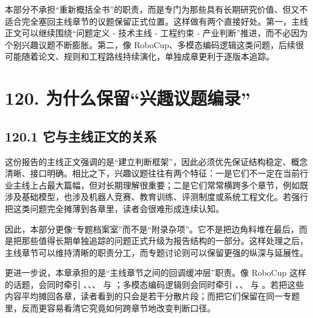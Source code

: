 

本部分不承担“重新概括全书”的职责，而是专门为那些具有长期研究价值、但又不适合完全塞回主线章节的议题保留正式位置。这样做有两个直接好处。第一，主线正文可以继续围绕“问题定义 - 技术主线 - 工程约束 - 产业判断”推进，而不必因为个别兴趣议题不断膨胀。第二，像 RoboCup、多模态编码逻辑这类问题，后续很可能随着论文、规则和工程路线持续演化，单独成章更利于逐版本追踪。

\section*{120. 为什么保留“兴趣议题编录”}

\subsection*{120.1 它与主线正文的关系}


这份报告的主线正文强调的是“建立判断框架”，因此必须优先保证结构稳定、概念清晰、接口明确。相比之下，兴趣议题往往有两个特征：一是它们不一定在当前行业主线上占最大篇幅，但对长期理解很重要；二是它们常常横跨多个章节，例如既涉及基础模型，也涉及机器人竞赛、教育训练、评测制度或系统工程文化。若强行把这类问题完全摊薄到各章里，读者会很难形成连续认知。

因此，本部分更像“专题档案室”而不是“附录杂项”。它不是把边角料堆在最后，而是把那些值得长期单独追踪的问题正式升级为报告结构的一部分。这样处理之后，主线章节可以维持清晰的职责分工，而专题讨论则可以保留更强的纵深与延展性。

更进一步说，本章承担的是“主线章节之间的回调缓冲层”职责。像 RoboCup 这样的话题，会同时牵引 \texttt{}、\texttt{}、\texttt{}、\texttt{} 与 \texttt{}；多模态编码逻辑则会同时牵引 \texttt{}、\texttt{}、\texttt{} 与 \texttt{}。若把这些内容平均摊回各章，读者看到的只会是若干分散片段；而把它们保留在同一专题里，反而更容易看清它究竟如何跨章节地改变判断口径。

